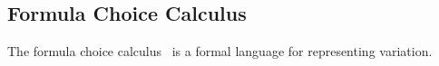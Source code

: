 \subsection{Formula Choice Calculus}
\label{sec:fcc}

The formula
choice calculus~\cite{HW16fosd} is a formal language for representing
variation.

%
